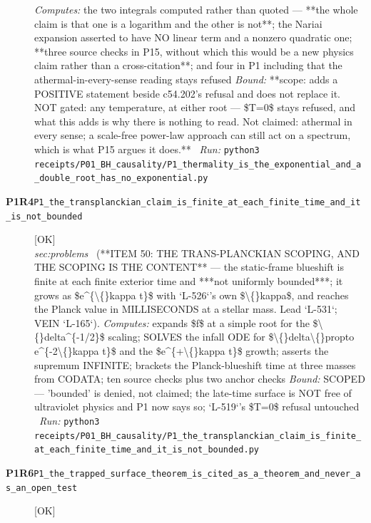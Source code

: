 \begin{description}
\emph{Computes:} the two integrals computed rather than quoted --- **the whole claim is that one is a logarithm and the other is not**; the Nariai expansion asserted to have NO linear term and a nonzero quadratic one; **three source checks in P15, without which this would be a new physics claim rather than a cross-citation**; and four in P1 including that the athermal-in-every-sense reading stays refused
 \emph{Bound:} **scope: adds a POSITIVE statement beside c54.202's refusal and does not replace it. NOT gated: any temperature, at either root --- \$T=0\$ stays refused, and what this adds is why there is nothing to read. Not claimed: athermal in every sense; a scale-free power-law approach can still act on a spectrum, which is what P15 argues it does.**
\ \emph{Run:} \texttt{python3 receipts/P01\_BH\_causality/P1\_thermality\_is\_the\_exponential\_and\_a\_double\_root\_has\_no\_exponential.py}
\item[\rcptlabel{P1_the_transplanckian_claim_is_finite_at_each_finite_time_and_it_is_not_bounded}{P1R4}\textbf{P1R4}\quad\texttt{P1\_the\_transplanckian\_claim\_is\_finite\_at\_each\_finite\_time\_and\_it\_is\_not\_bounded}]\hfill\textsf{[OK]}\\
\textit{sec:problems} \ (**ITEM 50: THE TRANS-PLANCKIAN SCOPING, AND THE SCOPING IS THE CONTENT** --- the static-frame blueshift is finite at each finite exterior time and ***not uniformly bounded***; it grows as \$e\textasciicircum{}\{\textbackslash\{\}kappa t\}\$ with `L-526`'s own \$\textbackslash\{\}kappa\$, and reaches the Planck value in MILLISECONDS at a stellar mass. Lead `L-531`; VEIN `L-165`). 
\emph{Computes:} expands \$f\$ at a simple root for the \$\textbackslash\{\}delta\textasciicircum{}\{-1/2\}\$ scaling; SOLVES the infall ODE for \$\textbackslash\{\}delta\textbackslash\{\}propto e\textasciicircum{}\{-2\textbackslash\{\}kappa t\}\$ and the \$e\textasciicircum{}\{+\textbackslash\{\}kappa t\}\$ growth; asserts the supremum INFINITE; brackets the Planck-blueshift time at three masses from CODATA; ten source checks plus two anchor checks
 \emph{Bound:} SCOPED --- 'bounded' is denied, not claimed; the late-time surface is NOT free of ultraviolet physics and P1 now says so; `L-519`'s \$T=0\$ refusal untouched
\ \emph{Run:} \texttt{python3 receipts/P01\_BH\_causality/P1\_the\_transplanckian\_claim\_is\_finite\_at\_each\_finite\_time\_and\_it\_is\_not\_bounded.py}
\item[\rcptlabel{P1_the_trapped_surface_theorem_is_cited_as_a_theorem_and_never_as_an_open_test}{P1R6}\textbf{P1R6}\quad\texttt{P1\_the\_trapped\_surface\_theorem\_is\_cited\_as\_a\_theorem\_and\_never\_as\_an\_open\_test}]\hfill\textsf{[OK]}\\

\end{description}
